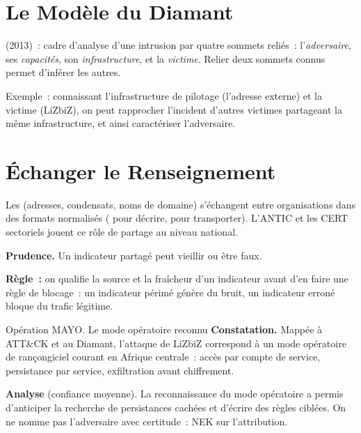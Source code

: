 \section{Le Modèle du Diamant}
\label{sec:c17-diamant}

\begin{boxdef}
 (2013)~: cadre d'analyse d'une intrusion par
quatre sommets reliés~: l'\emph{adversaire}, ses \emph{capacités}, son
\emph{infrastructure}, et la \emph{victime}. Relier deux sommets connus permet
d'inférer les autres.
\end{boxdef}

Exemple~: connaissant l'infrastructure de pilotage (l'adresse externe) et la
victime (LiZbiZ), on peut rapprocher l'incident d'autres victimes partageant
la même infrastructure, et ainsi caractériser l'adversaire.

\section{Échanger le Renseignement}
\label{sec:c17-echanger}

Les  (adresses, condensats, noms de
domaine) s'échangent entre organisations dans des formats normalisés
( pour décrire,  pour transporter). L'ANTIC et
les CERT sectoriels jouent ce rôle de partage au niveau national.

\begin{boxalert}
\textbf{Prudence.} Un indicateur partagé peut vieillir ou être faux.

\smallskip
\textbf{Règle~:} on qualifie la source et la fraîcheur d'un indicateur avant
d'en faire une règle de blocage~: un indicateur périmé génère du bruit, un
indicateur erroné bloque du trafic légitime.
\end{boxalert}

\begin{boxscenario}{Opération MAYO. Le mode opératoire reconnu}
\textbf{Constatation.} Mappée à ATT\&CK et au Diamant, l'attaque de LiZbiZ
correspond à un mode opératoire de rançongiciel courant en Afrique centrale~:
accès par compte de service, persistance par service, exfiltration avant
chiffrement.

\medskip
\textbf{Analyse} (confiance moyenne). La reconnaissance du mode opératoire a
permis d'anticiper la recherche de persistances cachées et d'écrire des
règles ciblées. On ne nomme pas l'adversaire avec certitude~: NEK sur
l'attribution.
\end{boxscenario}

